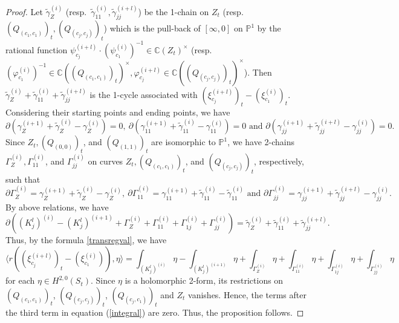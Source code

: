 \documentclass[letterpaper, 11pt]{amsart}
\theoremstyle{my theoremstyle}
\theoremstyle{dfn}
\theoremstyle{remark}
\renewcommand{\1}{\mathbbm{1}}
\newcommand{\C}{\mathbb{C}}
\renewcommand{\P}{\mathbb{P}}
\numberwithin{equation}{section}
\begin{document}
\begin{proof}
Let $\widetilde{\gamma}_{Z}^{(i)}$ (resp.~$\widetilde{\gamma}^{(i)}_{11},\widetilde{\gamma}^{(i+l)}_{jj}$) be the 1-chain on $Z_t$ (resp. $(Q_{(c_1,c_1)})_t, (Q_{(c_j,c_j)})_t$) which is the pull-back of $[\infty, 0]$ on $\P^1$ by the rational function $\psi_{c_j}^{(i+l)}\cdot (\psi_{c_1}^{(i)})^{-1} \in \C(Z_t)^\times$ (resp. $\left(\varphi_{c_1}^{(i)}\right)^{-1}\in \C((Q_{(c_1,c_1)})_t)^\times, \varphi_{c_j}^{(i+l)}\in \C((Q_{(c_j,c_j)})_t)^\times$).
Then $\widetilde{\gamma}_{Z}^{(i)}+\widetilde{\gamma}^{(i)}_{11}+\widetilde{\gamma}^{(i+l)}_{jj}$ is the 1-cycle associated with $(\xi_{c_j}^{(i+l)})_t - (\xi_{c_1}^{(i)})_t$.
Considering their starting points and ending points, we have
\begin{equation*}
\partial(\gamma_{Z}^{(i+1)} + \widetilde{\gamma}_{Z}^{(i)} -\gamma_{Z}^{(i)}) = 0,\:
\partial (\gamma_{11}^{(i+1)}+ \widetilde{\gamma}_{11}^{(i)}  -\gamma_{11}^{(i)}) = 0\text{ and }
\partial (\gamma^{(i+1)}_{jj}+\widetilde{\gamma}^{(i+l)}_{jj} -  \gamma_{jj}^{(i)}) = 0.
\end{equation*}
Since $Z_t,(Q_{(0,0)})_t$, and $(Q_{(1,1)})_t$ are isomorphic to $\P^1$, we have 2-chains $\Gamma_{Z}^{(i)},\Gamma_{11}^{(i)}$, and $\Gamma_{jj}^{(i)}$ on curves $Z_t,(Q_{(c_1,c_1)})_t$, and $(Q_{(c_j,c_j)})_t$, respectively,  such that
\begin{equation*}
\partial\Gamma_{Z}^{(i)} =\gamma_{Z}^{(i+1)} + \widetilde{\gamma}_{Z}^{(i)} -\gamma_{Z}^{(i)},\:
\partial\Gamma_{11}^{(i)} =\gamma_{11}^{(i+1)}+ \widetilde{\gamma}_{11}^{(i)}  -\widetilde{\gamma}_{11}^{(i)}\text{ and }
\partial\Gamma_{jj}^{(i)} = \gamma^{(i+1)}_{jj}+\widetilde{\gamma}^{(i+l)}_{jj} -  \gamma_{jj}^{(i)}.
\end{equation*}
By above relations, we have
\begin{equation*} 
\partial ((K_{j}^l)^{(i)}-(K_j^l)^{(i+1)} + \Gamma_{Z}^{(i)} + \Gamma_{11}^{(i)}+\Gamma_{1j}^{(i)}+\Gamma_{jj}^{(i)}) =  \widetilde{\gamma}^{(i)}_{Z}+\widetilde{\gamma}^{(i)}_{11}+\widetilde{\gamma}^{(i+l)}_{jj}.
\end{equation*}
Thus, by the formula \eqref{transregval}, we have 
\begin{equation}\label{integral}
\langle r((\xi_{c_j}^{(i+l)})_t - (\xi_{c_1}^{(i)})), \eta\rangle = \int_{(K_{j}^l)^{(i)}}\eta  - \int_{(K_j^l)^{(i+1)}}\eta + \int_{\Gamma_{Z}^{(i)}}\eta + \int_{\Gamma_{11}^{(i)}}\eta + \int_{\Gamma_{1j}^{(i)}}\eta +\int_{\Gamma_{jj}^{(i)}}\eta
\end{equation}
for each $\eta\in H^{2,0}(S_t)$.
Since $\eta$ is a holomorphic 2-form, its restrictions on $(Q_{(c_1,c_1)})_t$, $(Q_{(c_j,c_j)})_t$, $(Q_{(c_j,c_1)})_t$ and $Z_t$ vanishes.
Hence, the terms after the third term in equation (\ref{integral}) are zero.
Thus, the proposition follows.
\end{proof}
\end{document}
